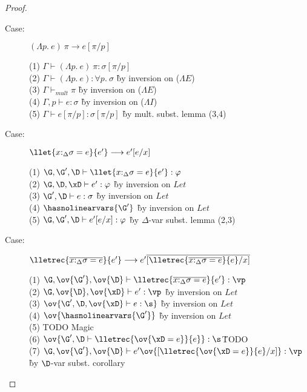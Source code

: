 \begin{proof}
\begin{description}
\item[Case:] $(\Lambda p.~e)~\pi \longrightarrow e[\pi/p]$
\begin{tabbing}
(1) $\Gamma \vdash (\Lambda p.~e)~\pi : \sigma[\pi/p]$\\
(2) $\Gamma \vdash (\Lambda p.~e) : \forall p.~\sigma$ \` by inversion on ($\Lambda E$) \\
(3) $\Gamma \vdash_{mult} \pi$ \` by inversion on ($\Lambda E$) \\
(4) $\Gamma, p \vdash e : \sigma$ \` by inversion on ($\Lambda I$) \\
(5) $\Gamma \vdash e[\pi/p]:\sigma[\pi/p]$ \` by mult. subst. lemma (3,4) \\
\end{tabbing}

\item[Case:] $\llet{x{:}_\Delta\sigma = e}{e'}\longrightarrow e'[e/x]$
\begin{tabbing}
(1) $\G, \G', \D\vdash \llet{x{:}_\Delta\sigma = e}{e'} : \varphi$\\
(2) $\G, \D, \xD \vdash e' : \varphi$ \` by inversion on $Let$ \\
(3) $\G', \D \vdash e : \sigma$ \` by inversion on $Let$\\
(4) $\hasnolinearvars{\G'}$ \` by inversion on $Let$\\
(5) $\G, \G', \D \vdash e'[e/x] : \varphi$ \` by $\Delta$-var subst. lemma (2,3)\\
\end{tabbing}

\item[Case:] $\lletrec{\overline{x{:}_\Delta\sigma = e}}{e'} \longrightarrow e'\overline{[\lletrec{\overline{x{:}_\Delta\sigma = e}}{e}/x]}$
\begin{tabbing}
    (1) $\G, \ov{\G'}, \ov{\D} \vdash \lletrec{\overline{x{:}_\Delta\sigma =
    e}}{e'} : \vp$\\
    (2) $\G,\ov{\D}, \ov{\xD} \vdash e' : \vp$ \` by inversion on $Let$\\
    (3) $\ov{\G',\D, \ov{\xD} \vdash e : \s}$ \` by inversion on $Let$\\
    (4) $\ov{\hasnolinearvars{\G'}}$ \` by inversion on $Let$\\
    (5) TODO Magic\\
    (6) $\ov{\G', \D \vdash \lletrec{\ov{\xD = e}}{e}} : \s$\` TODO\\
    (7) $\G, \ov{\G'}, \ov{\D} \vdash e'\ov{[\lletrec{\ov{\xD = e}}{e}/x]} :
    \vp$ \` by $\D$-var subst. corollary\\
\end{tabbing}


\end{description}
\end{proof}

